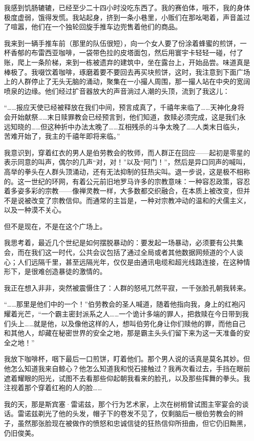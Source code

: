 \documentclass[AutoFakeBold=true]{book}
\begin{document}
我感到饥肠辘辘，已经至少二十四小时没吃东西了。我的赛伯体，哦不，我的身体极度虚弱，饿得发慌。我站起身，挤到一条小巷里，小贩们在那吆喝着，声音盖过了喧嚣，他们在一个独轮回旋手推车边兜售着他们的商品。

我来到一辆手推车前（那里的队伍很短），向一个女人要了份涂着蜂蜜的煎饼，一杯香郁的布雷西亚咖啡，一袋带色拉的皮塔面包，然后用寰宇卡轻轻一碰，付了账，爬上一条阶梯，来到一栋被遗弃的建筑中，坐在露台上，开始品尝。味道真是棒极了。我啜饮着咖啡，琢磨着要不要回去再买块煎饼，这时，我注意到下面广场上的人群停止了无头无脑的涌动，聚集在一小撮人周围，那一撮人站在中央的宽阔喷泉的边缘。他们经过扩音器放大的声音淌过人潮的头顶，流到了我这儿：

``……报应天使已经被释放在我们中间，预言成真了，千禧年来临了……天神化身将会开始献祭……末日赎罪教会已经预言到，他们知道，救赎必须完成，这是我们永远知晓的……但这种折中办法太晚了……互相残杀的斗争太晚了……人类末日临头，苦难开始了，我主的千禧年即将来临。''

我意识到，穿着红衣的男人是伯劳教会的牧师，而人群正在回应——起初是零星的表示同意的叫声，偶尔的几声``对，对！''以及``阿门！''，然后是异口同声的喊叫，高举的拳头在人群头顶涌动，还有无法抑制的狂热尖叫。退一步说，这是极不相称的。这一世纪的环网，有着公元前旧地罗马许多的宗教意味：一种容忍政策，容忍着多姿多彩的宗教——像禅灵教一样，大多数都交织融合，在本质上被改变，但并不是说被改变了宗教信仰。而通常的主旨是，一种对宗教冲动的温和的犬儒主义，以及一种漠不关心。

但不是现在，不是在这个广场上。

我思考着，最近几个世纪是如何摆脱暴动的：要发起一场暴动，必须要有公共集会，而在我们这一时代，公共会议包括了通过全局或者其他数据网频道的个人谈心；人们远隔千里，甚至远隔光年，仅仅是由通讯电缆和超光线路连接，在这种情形下，是很难创造暴徒的激情的。

我正在想入非非，突然被震慑住了：人群的怒吼兀然平寂，一千张脸孔朝我转来。

``……那里是他们中的一个！''伯劳教会的圣人喊道，随着他指向我，身上的红袍闪耀着光芒，``一个霸主密封派系之人……一个诡计多端的罪人，把救赎在今日带到我们头上……就是他，以及像他这样的人，想叫伯劳化身让你们赎他的罪，而他自己和其他人，却藏在秘密世界的安全之地，那是霸主头头们留下来为这一天准备的安全之地！''

我放下咖啡杯，咽下最后一口煎饼，盯着他们。那个男人说的话真是莫名其妙。但他怎么知道我来自鲸心？他怎么知道我和悦石接触过？我再次看过去，手挡在眼前遮着耀眼的阳光，试图不去看那些仰起朝我看来的脸孔，以及那些挥舞的拳头。我注视着那个穿着红袍的人的脸……

我的天，那是斯宾塞·雷诺兹，那个行为艺术家，上次在树梢曾试图主宰宴会的谈话。雷诺兹剃光了他的头发，帽子下的卷发不见了，仅剩脑后一根伯劳教会的辫子，虽然那张脸现在被做作的愤怒和忠诚信徒的狂热信仰所扭曲，但它仍旧黝黑，仍旧俊美。
\end{document}
